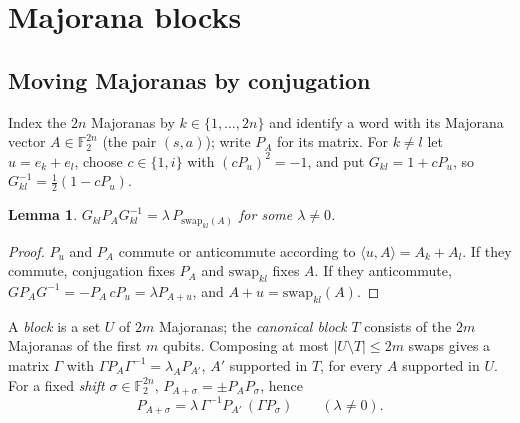 \documentclass[11pt]{article}
\newtheorem{lemma}[theorem]{Lemma}
\theoremstyle{definition}
\theoremstyle{remark}
\newcommand{\F}{\mathbb{F}}
\begin{document}
\section{Majorana blocks}\label{sec:blocks}

\subsection{Moving Majoranas by conjugation}
Index the $2n$ Majoranas by $k\in\{1,\dots,2n\}$ and identify a word with its Majorana vector $A\in\F_2^{2n}$ (the
pair $(s,a)$); write $P_A$ for its matrix. For $k\ne l$ let $u=e_k+e_l$, choose $c\in\{1,i\}$ with
$(cP_u)^2=-1$, and put $G_{kl}=1+cP_u$, so $G_{kl}^{-1}=\tfrac12(1-cP_u)$.

\begin{lemma}\label{lem:swap}
$G_{kl}P_AG_{kl}^{-1}=\lambda\,P_{\mathrm{swap}_{kl}(A)}$ for some $\lambda\ne0$.
\end{lemma}
\begin{proof}
$P_u$ and $P_A$ commute or anticommute according to $\langle u,A\rangle=A_k+A_l$. If they commute, conjugation
fixes $P_A$ and $\mathrm{swap}_{kl}$ fixes $A$. If they anticommute, $G P_AG^{-1}=-P_A\,cP_u=\lambda P_{A+u}$, and
$A+u=\mathrm{swap}_{kl}(A)$.
\end{proof}

A \emph{block} is a set $U$ of $2m$ Majoranas; the \emph{canonical block} $T$ consists of the $2m$ Majoranas of
the first $m$ qubits. Composing at most $|U\setminus T|\le2m$ swaps gives a matrix $\Gamma$ with
$\Gamma P_A\Gamma^{-1}=\lambda_AP_{A'}$, $A'$ supported in $T$, for every $A$ supported in $U$. For a fixed
\emph{shift} $\sigma\in\F_2^{2n}$, $P_{A+\sigma}=\pm P_AP_\sigma$, hence
\begin{equation}\label{eq:blockword}
P_{A+\sigma}=\lambda\,\Gamma^{-1}P_{A'}\,(\Gamma P_\sigma)\qquad(\lambda\ne0).
\end{equation}
\end{document}
